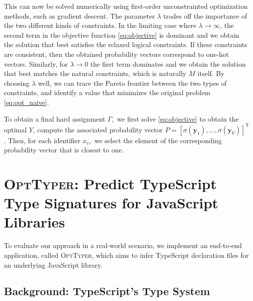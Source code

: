 \documentclass[sigplan,10pt,review,anonymous]{acmart} %
\newcommand{\qqpi}[2]{[\![#2]\!]_{#1}}
\newcommand{\projectname}{\textsc{OptTyper}\xspace}
\theoremstyle{plain}
\theoremstyle{remark}
\theoremstyle{definition}
\begin{document}
This can now be solved numerically using first-order unconstrainted optimization methods, such as gradient descent.
The parameter $\lambda$ trades off the importance
of the two different kinds of constraints.
In the limiting case where $\lambda \rightarrow \infty$, the second term in the objective function \eqref{eq:objective} is dominant and we obtain the solution that best satisfies the relaxed
logical constraints.
If these constraints are consistent, then the obtained probability vectors correspond to one-hot vectors.
Similarly, for $\lambda \rightarrow 0$ the first term dominates and we obtain the solution that best matches the natural constraints,
which is naturally $M$ itself. By choosing $\lambda$ well,
we can trace the Pareto frontier between the two types of constraints,
and identify a value that minimizes the original problem \eqref{eq:opt_naive}.

To obtain a final hard assignment $\Gamma,$ we first solve \eqref{eq:objective} to obtain the optimal $Y$, compute the
associated probability vector $P = [\sigma(\bm{y}_1), \ldots, \sigma(\bm{y}_{V})]^\mathsf{T}$. Then, for each identifier $x_v,$
we select the element of the
corresponding probability vector that is closest to one.

\section{\projectname: Predict TypeScript Type Signatures for JavaScript Libraries}
\label{sec:prodts}
To evaluate our approach in a real-world scenario, we
implement an end-to-end application, called \projectname, which aims
to infer TypeScript declaration files
for an underlying JavaScript library.

\subsection{Background: TypeScript's Type System}
\label{ssec:intro-typescript}
\end{document}
